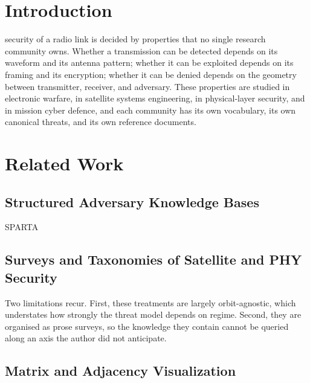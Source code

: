 \documentclass[journal]{IEEEtran}
\newif\ifshowguides
\newcommand{\guide}[1]{%
  \ifshowguides
    {\par\smallskip\footnotesize\color{guidecol}%
     \textsf{\textbf{[guide]}~#1}\par\smallskip}%
  \fi}
\begin{document}
\guide{Trim the abstract to roughly 150--200 words before submission; the
version above is long on purpose so you can cut rather than invent. The
sentence that must survive intact is the one naming the contribution:
\emph{crossing} facets that prior work treats separately.}

\section{Introduction}
 security of a radio link is decided by properties
that no single research community owns. Whether a transmission can be
detected depends on its waveform and its antenna pattern; whether it can
be exploited depends on its framing and its encryption; whether it can be
denied depends on the geometry between transmitter, receiver, and
adversary. These properties are studied in electronic warfare, in
satellite systems engineering, in physical-layer security, and in mission
cyber defence, and each community has its own vocabulary, its own
canonical threats, and its own reference documents.



\section{Related Work}

\subsection{Structured Adversary Knowledge Bases}
SPARTA


\subsection{Surveys and Taxonomies of Satellite and PHY Security}


Two limitations recur. First, these treatments are largely
orbit-agnostic, which understates how strongly the threat model depends
on regime. Second, they are organised as prose surveys, so the knowledge
they contain cannot be queried along an axis the author did not
anticipate.

\subsection{Matrix and Adjacency Visualization}
\end{document}
